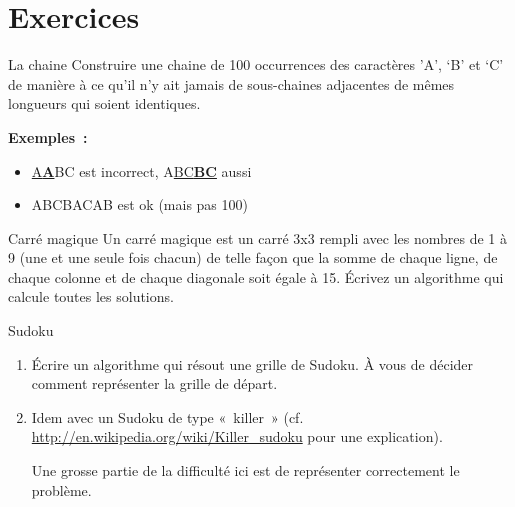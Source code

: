 		
\section{Exercices}

	\begin{Exercice}{La chaine}
		Construire une chaine de 100 occurrences des caractères 
		'A', `B' et `C' de manière à ce qu'il n'y ait jamais de
		sous-chaines adjacentes de mêmes longueurs qui soient identiques.

		\textbf{Exemples~: }

		\begin{itemize}
			\item {
				\underline{A\textbf{A}}BC est incorrect, A\underline{BC\textbf{BC}} aussi}
			\item {
				ABCBACAB est ok (mais pas 100)}
		\end{itemize}
	\end{Exercice}
	
	\begin{Exercice}{Carré magique}
		Un carré magique est un carré 3x3 rempli avec les nombres de 1 à 9 
		(une et une seule fois chacun) de telle façon que la
		somme de chaque ligne, de chaque colonne et de chaque diagonale 
		soit égale à 15. Écrivez un algorithme qui calcule
		toutes les solutions.
	\end{Exercice}
	
	\begin{Exercice}{Sudoku}
		\begin{enumerate}
			\item {
				Écrire un algorithme qui résout une grille de Sudoku. 
				À vous de décider comment représenter la grille de départ.}
			\item {
				Idem avec un Sudoku de type «~killer~» \newline
				(cf. \url{http://en.wikipedia.org/wiki/Killer_sudoku} pour une explication).
				
				Une grosse partie de la difficulté ici est de représenter correctement le problème.}
		\end{enumerate}
	\end{Exercice}
	

